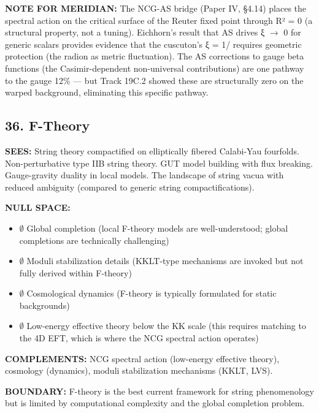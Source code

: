 \textbf{NOTE FOR MERIDIAN:} The NCG-AS bridge (Paper IV, §4.14) places the spectral action on the critical surface of the Reuter fixed point through R² = 0 (a structural property, not a tuning). Eichhorn's result that AS drives ξ $\rightarrow$ 0 for generic scalars provides evidence that the cuscuton's ξ = 1/ requires geometric protection (the radion as metric fluctuation). The AS corrections to gauge beta functions (the Casimir-dependent non-universal contributions) are one pathway to the gauge 12\% — but Track 19C.2 showed these are structurally zero on the warped background, eliminating this specific pathway.


\bigskip\noindent\makebox[\textwidth]{\color{rulegray}\rule{5cm}{0.3pt}}\bigskip


\subsection*{36. F-Theory}


\textbf{SEES:} String theory compactified on elliptically fibered Calabi-Yau fourfolds. Non-perturbative type IIB string theory. GUT model building with flux breaking. Gauge-gravity duality in local models. The landscape of string vacua with reduced ambiguity (compared to generic string compactifications).


\textbf{NULL SPACE:}

\begin{itemize}[nosep,leftmargin=*]
  \item $\emptyset$ Global completion (local F-theory models are well-understood; global completions are technically challenging)
  \item $\emptyset$ Moduli stabilization details (KKLT-type mechanisms are invoked but not fully derived within F-theory)
  \item $\emptyset$ Cosmological dynamics (F-theory is typically formulated for static backgrounds)
  \item $\emptyset$ Low-energy effective theory below the KK scale (this requires matching to the 4D EFT, which is where the NCG spectral action operates)
\end{itemize}


\textbf{COMPLEMENTS:} NCG spectral action (low-energy effective theory), cosmology (dynamics), moduli stabilization mechanisms (KKLT, LVS).


\textbf{BOUNDARY:} F-theory is the best current framework for string phenomenology but is limited by computational complexity and the global completion problem.


